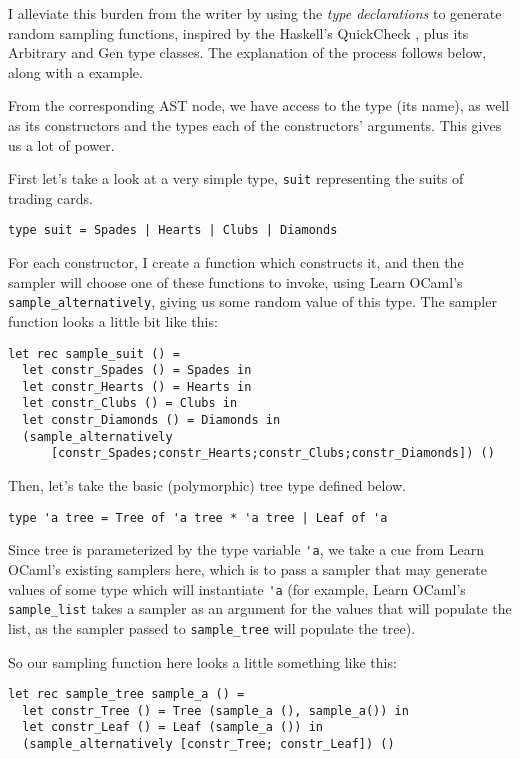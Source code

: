 \documentclass[11pt]{article}
\begin{document}
I alleviate this burden from the writer by using the \textit{type declarations} to generate random sampling functions, inspired by the Haskell's QuickCheck \cite{claessen2011quickcheck}, plus its Arbitrary and Gen type classes. The explanation of the process follows below, along with a example.

From the corresponding AST node, we have access to the type (its name), as well as its constructors and the types each of the constructors' arguments. This gives us a lot of power.

First let's take a look at a very simple type, \verb+suit+ representing the suits of trading cards.

\begin{lstlisting}
type suit = Spades | Hearts | Clubs | Diamonds
\end{lstlisting}

For each constructor, I create a function which constructs it, and then the sampler will choose one of these functions to invoke, using Learn OCaml's \verb+sample_alternatively+, giving us some random value of this type. The sampler function looks a little bit like this:

\begin{lstlisting}[basicstyle=\footnotesize]
let rec sample_suit () =
  let constr_Spades () = Spades in
  let constr_Hearts () = Hearts in
  let constr_Clubs () = Clubs in
  let constr_Diamonds () = Diamonds in
  (sample_alternatively
      [constr_Spades;constr_Hearts;constr_Clubs;constr_Diamonds]) ()
\end{lstlisting}

Then, let's take the basic (polymorphic) tree type defined below.

\begin{lstlisting}
type 'a tree = Tree of 'a tree * 'a tree | Leaf of 'a
\end{lstlisting}

Since tree is parameterized by the type variable \verb+'a+, we take a cue from Learn OCaml's existing samplers here, which is to pass a sampler that may generate values of some type which will instantiate \verb+'a+ (for example, Learn OCaml's \verb+sample_list+ takes a sampler as an argument for the values that will populate the list, as the sampler passed to \verb+sample_tree+ will populate the tree).

So our sampling function here looks a little something like this:

\begin{lstlisting}
let rec sample_tree sample_a () =
  let constr_Tree () = Tree (sample_a (), sample_a()) in
  let constr_Leaf () = Leaf (sample_a ()) in
  (sample_alternatively [constr_Tree; constr_Leaf]) ()
\end{lstlisting}
\end{document}
